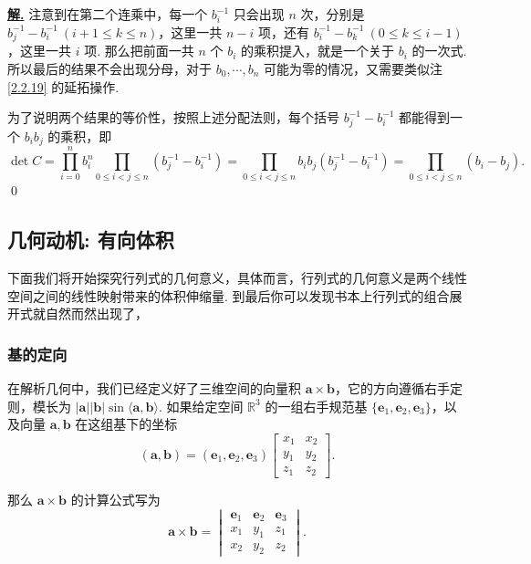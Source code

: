 \documentclass[10pt,openany]{article}
\theoremstyle{thmstyle} %
\theoremstyle{defstyle} %
\theoremstyle{prostyle} %
\theoremstyle{exastyle}
\theoremstyle{remstyle}
\newenvironment{solution}{\par\underline{\textbf{解.}} \;\fangsong}{\qed\par}
\newcommand{\R}{\mathbb{R}}
\begin{document}
\begin{solution}
	注意到在第二个连乘中，每一个 \( b_i^{-1} \) 只会出现 \( n \) 次，分别是 \( b_j^{-1}-b_i^{-1} \ (i+1 \leq k \leq n) \)，这里一共 \( n-i \) 项，还有 \( b_i^{-1}-b_k^{-1} \ (0 \leq k \leq i-1) \)，这里一共 \( i \) 项. 那么把前面一共 \( n \) 个 \( b_i \) 的乘积提入，就是一个关于 \( b_i \) 的一次式. 所以最后的结果不会出现分母，对于 \( b_0,\cdots,b_n  \) 可能为零的情况，又需要类似注 \ref{2.2.19} 的延拓操作.
	
	为了说明两个结果的等价性，按照上述分配法则，每个括号 \( b_j^{-1}-b_i^{-1} \) 都能得到一个 \(b_ib_j \) 的乘积，即
	\[ \det C= \prod_{i=0}^{n} b_i^n \prod_{0 \leq i<j \leq n}^{} (b_j^{-1}-b_i^{-1})= \prod_{0 \leq i<j \leq n}^{} b_ib_j (b_j^{-1}-b_i^{-1})=\prod_{0 \leq i<j \leq n}^{}  (b_i-b_j). \]
\end{solution}

\subsection{几何动机: 有向体积}
\label{2.3}

下面我们将开始探究行列式的几何意义，具体而言，行列式的几何意义是两个线性空间之间的线性映射带来的体积伸缩量. 到最后你可以发现书本上行列式的组合展开式就自然而然出现了，

\subsubsection{基的定向}\label{Sec 2.3.1}


在解析几何中，我们已经定义好了三维空间的向量积 \( \bm{a} \times \bm{b} \)，它的方向遵循右手定则，模长为 \( |\bm{a}||\bm{b}|\sin \langle \bm{a},\bm{b} \rangle \). 如果给定空间 \( \R^3 \) 的一组右手规范基 \( \{\bm{e}_1,\bm{e}_2,\bm{e}_3 \} \)，以及向量 \( \bm{a}, \bm{b} \) 在这组基下的坐标
\[ (\bm{a},\bm{b})=(\bm{e}_1,\bm{e}_2,\bm{e}_3)\begin{bmatrix}
	x_1 & x_2 \\ y_1 & y_2 \\ z_1 & z_2
\end{bmatrix}. \]

那么 \( \bm{a} \times \bm{b} \) 的计算公式写为
\[ \bm{a} \times \bm{b}= \begin{vmatrix}
	\bm{e}_1 & \bm{e}_2 & \bm{e}_3 \\
	x_1 & y_1 & z_1 \\
	x_2 & y_2 & z_2
\end{vmatrix}. \]
\end{document}
